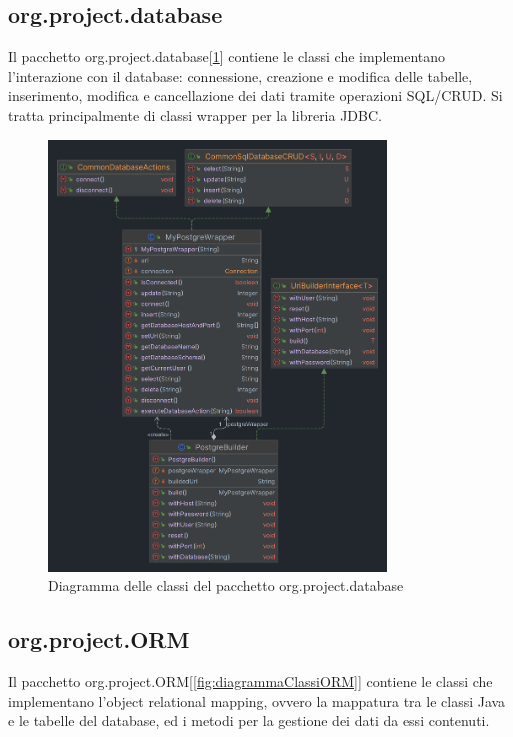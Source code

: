 \documentclass[
    10pt, %
    a4paper, %
    oneside, %
    headinclude,footinclude, %
    BCOR5mm, %
]{scrartcl}
\begin{document}
    \subsection{org.project.database}\label{subsec:database}

    Il pacchetto org.project.database[\ref{fig:diagrammaClassiDatabase}] contiene le classi che
    implementano l'interazione con il database: connessione,
    creazione e modifica delle tabelle, inserimento, modifica e cancellazione dei dati tramite operazioni SQL/CRUD\@.
    Si tratta principalmente di classi wrapper per la libreria JDBC\@.

    \begin{figure}[tb]
        \centering
        \includegraphics[width=0.8\textwidth]{Figures/UML/DATABASE}
        \caption{Diagramma delle classi del pacchetto org.project.database}
        \label{fig:diagrammaClassiDatabase}
    \end{figure}

    \subsection{org.project.ORM}\label{subsec:ORM}

    Il pacchetto org.project.ORM[\ref{fig:diagrammaClassiORM}] contiene le classi che implementano l'object relational
    mapping, ovvero la mappatura tra le classi Java e le tabelle del database, ed i metodi per la gestione dei dati da
    essi contenuti.
\end{document}
